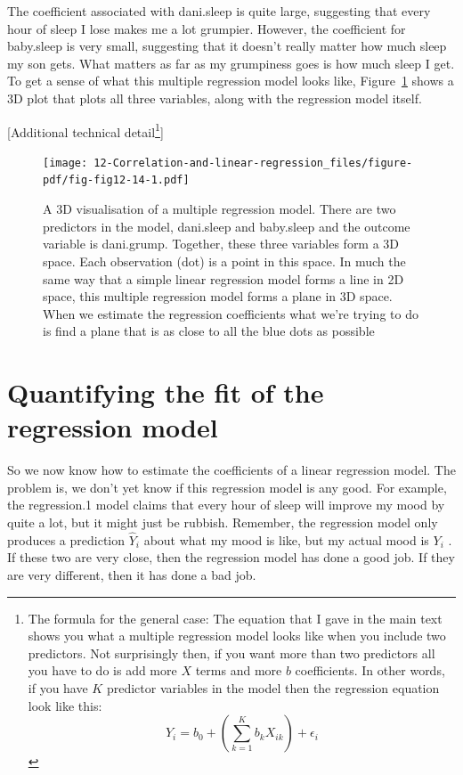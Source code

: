 \documentclass[
  a4paper,
]{book}
\begin{document}
The coefficient associated with dani.sleep is quite large, suggesting
that every hour of sleep I lose makes me a lot grumpier. However, the
coefficient for baby.sleep is very small, suggesting that it doesn't
really matter how much sleep my son gets. What matters as far as my
grumpiness goes is how much sleep I get. To get a sense of what this
multiple regression model looks like, Figure~\ref{fig-fig12-14} shows a
3D plot that plots all three variables, along with the regression model
itself.

{[}Additional technical detail\footnote{The formula for the general
  case: The equation that I gave in the main text shows you what a
  multiple regression model looks like when you include two predictors.
  Not surprisingly then, if you want more than two predictors all you
  have to do is add more \(X\) terms and more \(b\) coefficients. In
  other words, if you have \(K\) predictor variables in the model then
  the regression equation look like this:
  \[Y_i=b_0+(\sum_{k=1}^{K}b_k X_{ik})+\epsilon_i\]}{]}

\begin{figure}[h!]

\texttt{[image: 12-Correlation-and-linear-regression\_files/figure-pdf/fig-fig12-14-1.pdf]} \hfill{}

\caption{\label{fig-fig12-14}A 3D visualisation of a multiple regression
model. There are two predictors in the model, dani.sleep and baby.sleep
and the outcome variable is dani.grump. Together, these three variables
form a 3D space. Each observation (dot) is a point in this space. In
much the same way that a simple linear regression model forms a line in
2D space, this multiple regression model forms a plane in 3D space. When
we estimate the regression coefficients what we're trying to do is find
a plane that is as close to all the blue dots as possible}

\end{figure}

\hypertarget{quantifying-the-fit-of-the-regression-model}{%
\section{Quantifying the fit of the regression
model}\label{quantifying-the-fit-of-the-regression-model}}

So we now know how to estimate the coefficients of a linear regression
model. The problem is, we don't yet know if this regression model is any
good. For example, the regression.1 model claims that every hour of
sleep will improve my mood by quite a lot, but it might just be rubbish.
Remember, the regression model only produces a prediction \(\hat{Y}_i\)
about what my mood is like, but my actual mood is \(Y_i\) . If these two
are very close, then the regression model has done a good job. If they
are very different, then it has done a bad job.
\end{document}

